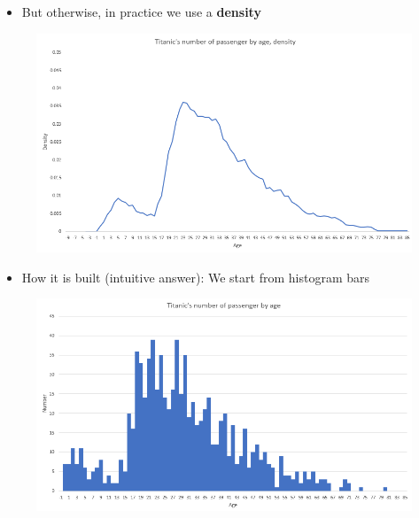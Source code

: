 \documentclass[compress]{beamer}
\begin{document}
\begin{frame}
	\begin{itemize}
		\item But otherwise, in practice we use a \textbf{density}
	\end{itemize}
	\begin{figure}
		\centering
		\includegraphics[scale=0.6]{Picture/Titanic age density.PNG}
	\end{figure}
\end{frame}

\begin{frame}
	\begin{itemize}
		\item How it is built (intuitive answer): We start from histogram bars
	\end{itemize}
	\begin{figure}
		\centering
		\includegraphics[scale=0.6]{Picture/Titanic bar chart passenger age.PNG}
	\end{figure}
\end{frame}
\end{document}
